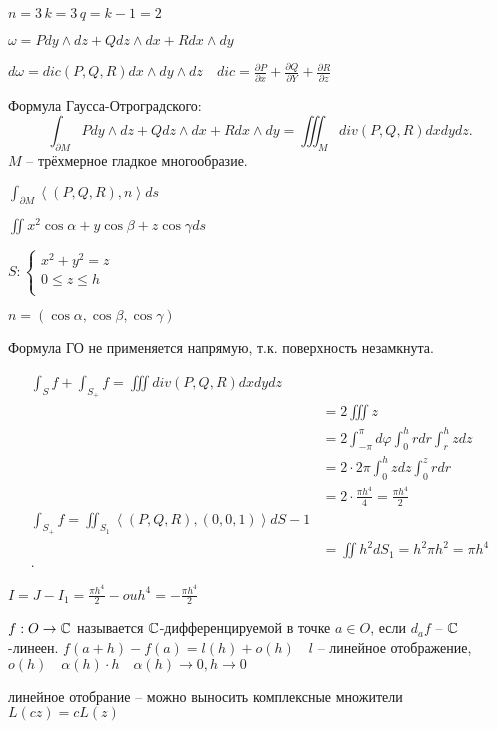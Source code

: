 \begin{note}
    $n=3\,k=3\,q=k-1=2$

     $\omega = Pdy\wedge dz + Qdz\wedge dx + Rdx\wedge dy$

     $d\omega = dic\left(P,Q,R \right) dx\wedge dy\wedge dz\quad dic = \frac{\partial P}{\partial x} + \frac{\partial Q}{\partial Y} + \frac{\partial R}{\partial z}$

     Формула Гаусса-Отроградского:
     \[
         \int_{\partial M}Pdy\wedge dz + Qdz\wedge dx + Rdx\wedge dy = \iiint_M div(P,Q,R)dxdydz
     .\] 
     $M$ -- трёхмерное гладкое многообразие.

     $\int_{\partial M}\left<\left( P,Q,R \right),n  \right>ds$
\end{note}

\begin{example}
    $\iint x^2\cos\alpha + y\cos\beta + z\cos\gamma ds$

    $S: \begin{cases}
        x^2+y^2 = z\\
        0\leqslant z\leqslant h\\
    \end{cases}$ 

    $n = \left( \cos \alpha, \cos \beta, \cos \gamma \right) $

    Формула ГО не применяется напрямую, т.к. поверхность незамкнута.

    \begin{align*}
        \int_S f + \int_{S_+} f= \iiint div\left(P,Q,R  \right) dxdydz\\
        &= 2\iiint z   \\
        &= 2\int_{-\pi }^{\pi }d\varphi \int _0^hr dr \int _r^hzdz \\
        &= 2\cdot 2\pi \int_0^hzdz \int_0^zr dr \\
        &= 2\cdot \frac{\pi h^4}{4} = \frac{\pi h^4}{2} \\
        \int_{S_+}f = \iint _{S_1}\left<\left( P,Q,R \right) ,\left( 0,0,1 \right)  \right>dS-1  \\
        &= \iint h^2dS_1 = h^2\pi h^2 = \pi h^4  \\
    .\end{align*} 

    $I = J - I_1 = \frac{\pi h^4}{2} - ouh^4 = -\frac{\pi h^4}{2}$
\end{example}

\begin{note}

    $f:O \to \mathbb{C}$ называется $\mathbb{C}$-дифференцируемой в точке $a\in O$, если  $d_af$ --  $\mathbb{C}$ -линеен. $f(a+h) - f(a) = l(h) + o(h)\quad l$ -- линейное отображение, $o(h)\quad \alpha(h)\cdot h\quad \alpha(h) \to 0, h\to 0$

    линейное отобрание -- можно выносить комплексные множители $L(cz) = cL(z)$
\end{note}

